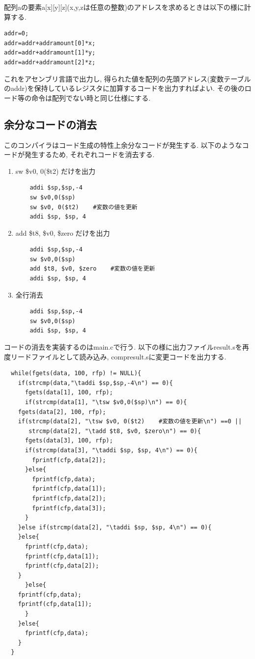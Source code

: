 \documentclass[a4j]{jarticle}
\begin{document}
配列aの要素a[x][y][z](x,y,zは任意の整数)のアドレスを求めるときは以下の様に計算する.
\begin{verbatim}
addr=0;
addr=addr+addramount[0]*x;
addr=addr+addramount[1]*y;
addr=addr+addramount[2]*z;
\end{verbatim}
これをアセンブリ言語で出力し, 得られた値を配列の先頭アドレス(変数テーブルのaddr)を保持しているレジスタに加算するコードを出力すればよい. その後のロード等の命令は配列でない時と同じ仕様にする. 

\subsection{余分なコードの消去}

このコンパイラはコード生成の特性上余分なコードが発生する. 以下のようなコードが発生するため, それぞれコードを消去する.

\begin{enumerate}
\item sw \$v0, 0(\$t2) だけを出力
\begin{verbatim}
	addi $sp,$sp,-4
	sw $v0,0($sp)
	sw $v0, 0($t2)    #変数の値を更新
	addi $sp, $sp, 4
\end{verbatim}
\item add \$t8, \$v0, \$zero だけを出力
\begin{verbatim}
	addi $sp,$sp,-4
	sw $v0,0($sp)
	add $t8, $v0, $zero    #変数の値を更新
	addi $sp, $sp, 4
\end{verbatim}
\item 全行消去
\begin{verbatim}
	addi $sp,$sp,-4
	sw $v0,0($sp)
	addi $sp, $sp, 4
\end{verbatim}
\end{enumerate}

コードの消去を実装するのはmain.cで行う. 以下の様に出力ファイルresult.sを再度リードファイルとして読み込み, compresult.sに変更コードを出力する.
\begin{verbatim}
  while(fgets(data, 100, rfp) != NULL){
    if(strcmp(data,"\taddi $sp,$sp,-4\n") == 0){
      fgets(data[1], 100, rfp);
      if(strcmp(data[1], "\tsw $v0,0($sp)\n") == 0){
	fgets(data[2], 100, rfp);
	if(strcmp(data[2], "\tsw $v0, 0($t2)    #変数の値を更新\n") ==0 ||
	   strcmp(data[2], "\tadd $t8, $v0, $zero\n") == 0){
	  fgets(data[3], 100, rfp);
	  if(strcmp(data[3], "\taddi $sp, $sp, 4\n") == 0){
	    fprintf(cfp,data[2]);
	  }else{
	    fprintf(cfp,data);
	    fprintf(cfp,data[1]);
	    fprintf(cfp,data[2]);
	    fprintf(cfp,data[3]);
	  }
	}else if(strcmp(data[2], "\taddi $sp, $sp, 4\n") == 0){
	}else{
	  fprintf(cfp,data);
	  fprintf(cfp,data[1]);
	  fprintf(cfp,data[2]);
	}
      }else{
	fprintf(cfp,data);
	fprintf(cfp,data[1]);
      }
    }else{
      fprintf(cfp,data);
    }
  }
\end{verbatim}
\end{document}
